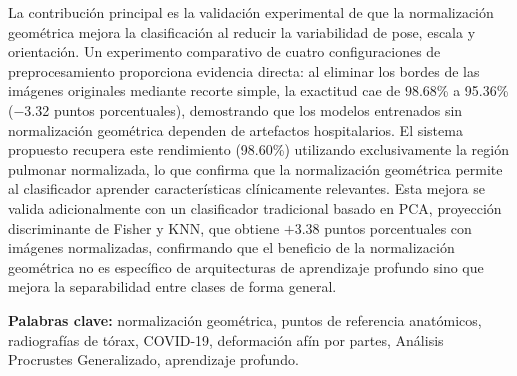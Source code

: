 La contribuci\'on principal es la validaci\'on experimental de que la normalizaci\'on geom\'etrica mejora la clasificaci\'on al reducir la variabilidad de pose, escala y orientación. Un experimento comparativo de cuatro configuraciones de preprocesamiento proporciona evidencia directa: al eliminar los bordes de las im\'agenes originales mediante recorte simple, la exactitud cae de 98.68\% a 95.36\% ($-$3.32 puntos porcentuales), demostrando que los modelos entrenados sin normalizaci\'on geométrica dependen de artefactos hospitalarios. El sistema propuesto recupera este rendimiento (98.60\%) utilizando exclusivamente la regi\'on pulmonar normalizada, lo que confirma que la normalizaci\'on geom\'etrica permite al clasificador aprender caracter\'isticas cl\'inicamente relevantes. Esta mejora se valida adicionalmente con un clasificador tradicional basado en PCA, proyecci\'on discriminante de Fisher y KNN, que obtiene $+$3.38 puntos porcentuales con im\'agenes normalizadas, confirmando que el beneficio de la normalizaci\'on geom\'etrica no es espec\'ifico de arquitecturas de aprendizaje profundo sino que mejora la separabilidad entre clases de forma general.

\textbf{Palabras clave:} normalizaci\'on geom\'etrica, puntos de referencia anat\'omicos, radiograf\'ias de t\'orax, COVID-19, deformaci\'on af\'in por partes, An\'alisis Procrustes Generalizado, aprendizaje profundo.

\vspace{1.5cm}
